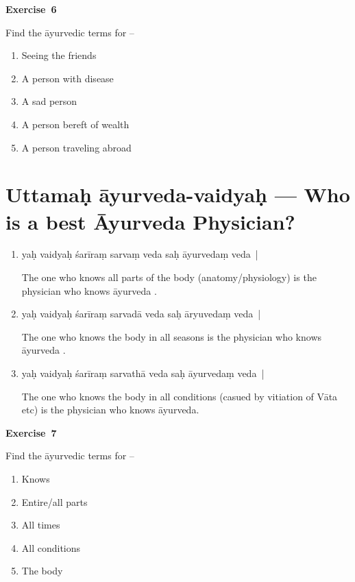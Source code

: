 \centerline{\textbf{Exercise~6}}

Find the āyurvedic terms for –
\begin{enumerate}
\itemsep=0pt
\renewcommand{\theenumi}{\alph{enumi}}
\renewcommand{\labelenumi}{\theenumi.}
\item Seeing the friends
\item A person with disease
\item A sad person
\item A person bereft of wealth
\item A person traveling abroad 
\end{enumerate}

\chapter{Uttamaḥ  āyurveda-vaidyaḥ --- Who is a best Āyurveda Physician?} 

\begin{enumerate}
\itemsep=0pt
\item {}

yaḥ vaidyaḥ śarīraṃ sarvaṃ  veda saḥ āyurvedaṃ veda~| 

The one who knows all parts of the body (anatomy/physiology) is the physician who knows āyurveda . 

\item {}

yaḥ vaidyaḥ śarīraṃ  sarvadā veda saḥ āryuvedaṃ veda~| 

The one who knows the body in all seasons is the physician who knows āyurveda .

\item {}

yaḥ vaidyaḥ śarīraṃ  sarvathā veda saḥ āyurvedaṃ veda~| 

The one who knows the body in all conditions (casued by vitiation of Vāta etc) is the physician who knows āyurveda.
\end{enumerate}

\centerline{\textbf{Exercise~7}}

Find the āyurvedic terms for –
\begin{enumerate}
\itemsep=0pt
\renewcommand{\theenumi}{\alph{enumi}}
\renewcommand{\labelenumi}{\theenumi.}
\item Knows
\item Entire/all parts
\item All times
\item All conditions
\item The body
\end{enumerate}

